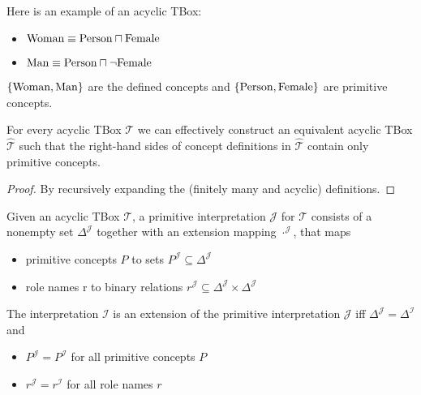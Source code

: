 \begin{example}
	Here is an example of an acyclic TBox:
	\begin{itemize}
		\item $ \var{Woman} \equiv \var{Person} \sqcap \var{Female}$
		\item $\var{Man} \equiv \var{Person} \sqcap \neg \var{Female}$
	\end{itemize}
	$\left\{ \mathit{\text{Woman}}, \mathit{\text{Man}} \right\} $ are the defined concepts and $\left\{ \mathit{\text{Person}}, \mathit{\text{Female}} \right\}$ are primitive concepts.
\end{example}

\begin{prop}
	For every acyclic TBox $\mathcal{T}$ we can effectively construct an equivalent acyclic TBox $ \widehat{\mathcal{T}}$
	such that the right-hand sides of concept definitions in $\widehat{\mathcal{T}}$ contain only primitive concepts.
\end{prop}
\begin{proof}
	By recursively expanding the (finitely many and acyclic) definitions.
\end{proof}

Given an acyclic TBox $\mathcal{T}$, a primitive interpretation $\mathcal{J}$ for $\mathcal{T}$ 
consists of a nonempty set $\Delta^{\mathcal{J}}$ together with an extension mapping $\cdot^{\mathcal{J}}$, that maps
\begin{itemize}
	\item primitive concepts $P$ to sets $P^{\mathcal{J}} \subseteq \Delta^{\mathcal{J}}$ 
	\item role names r to binary relations $r^\mathcal{J} \subseteq \Delta^{\mathcal{J}} \times \Delta^{\mathcal{J}}$
\end{itemize}
The interpretation $\mathcal{I}$ is an extension of the primitive interpretation $\mathcal{J}$ iff $\Delta^{\mathcal{J}} = \Delta^{\mathcal{I}}$ and
 \begin{itemize}
	\item $P^{\mathcal{J}} = P^{\mathcal{I}}$ for all primitive concepts $P$ 
	\item $r^{\mathcal{J}} = r^{\mathcal{I}}$ for all role names $r$
\end{itemize}

